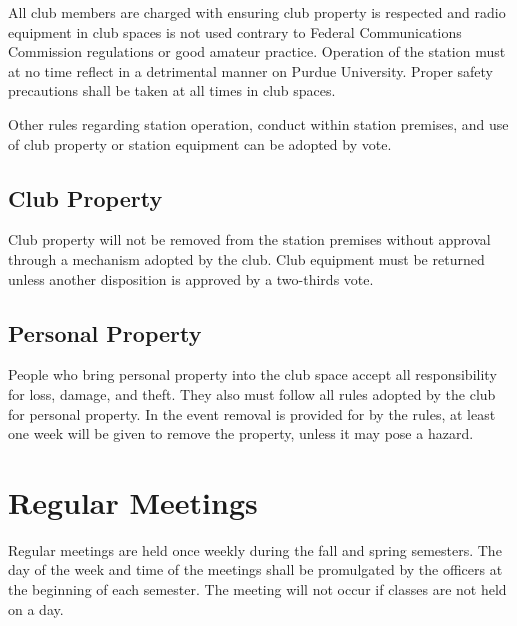 \documentclass{article}
\begin{document}
All club members are charged with ensuring club property is respected and radio
equipment in club spaces is not used contrary to Federal Communications
Commission regulations or good amateur practice. Operation of the station must
at no time reflect in a detrimental manner on Purdue University. Proper safety
precautions shall be taken at all times in club spaces.

Other rules regarding station operation, conduct within station premises, and
use of club property or station equipment can be adopted by vote.

\subsection{Club Property}

Club property will not be removed from the station premises without approval
through a mechanism adopted by the club. Club equipment must be returned unless
another disposition is approved by a two-thirds vote.

\subsection{Personal Property}

People who bring personal property into the club space accept all responsibility
for loss, damage, and theft. They also must follow all rules adopted by the club
for personal property. In the event removal is provided for by the rules, at
least one week will be given to remove the property, unless it may pose a
hazard.

\section{Regular Meetings}


Regular meetings are held once weekly during the fall and spring semesters. The
day of the week and time of the meetings shall be promulgated by the officers at
the beginning of each semester. The meeting will not occur if classes are not
held on a day. 
\end{document}
